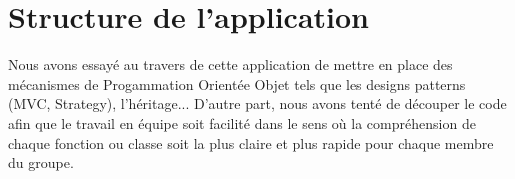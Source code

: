 \section{Structure de l'application}









Nous avons essayé au travers de cette application de mettre en place des mécanismes de Progammation Orientée Objet tels que les designs patterns (MVC, Strategy), l'héritage... D'autre part, nous avons tenté de découper le code afin que le travail en équipe soit facilité dans le sens où la compréhension de chaque fonction ou classe soit la plus claire et plus rapide pour chaque membre du groupe.